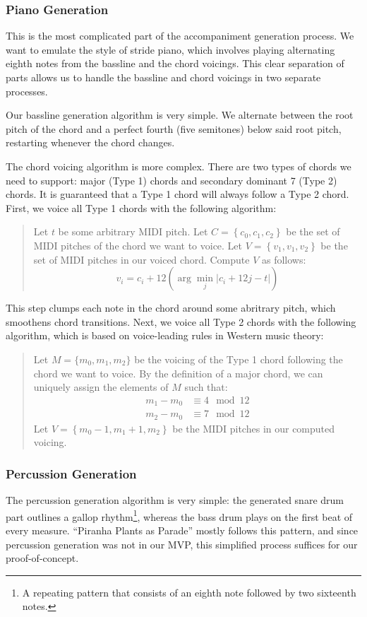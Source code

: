 \subsubsection{Piano Generation}

This is the most complicated part of the accompaniment generation process. We want to emulate the style of stride piano, which involves playing alternating eighth notes from the bassline and the chord voicings. This clear separation of parts allows us to handle the bassline and chord voicings in two separate processes.

Our bassline generation algorithm is very simple. We alternate between the root pitch of the chord and a perfect fourth (five semitones) below said root pitch, restarting whenever the chord changes.

The chord voicing algorithm is more complex. There are two types of chords we need to support: major (Type 1) chords and secondary dominant 7 (Type 2) chords. It is guaranteed that a Type 1 chord will always follow a Type 2 chord. First, we voice all Type 1 chords with the following algorithm:
\begin{quote}
    Let $t$ be some arbitrary MIDI pitch.
    Let $C = \left\{ c_0, c_1, c_2 \right\}$ be the set of MIDI pitches of the chord we want to voice.
    Let $V = \left\{ v_1, v_1, v_2 \right\}$ be the set of MIDI pitches in our voiced chord.
    Compute $V$ as follows:
    $$v_i = c_i + 12 \left( \arg\min_{j} \left\vert c_i + 12j - t \right\vert \right)$$
\end{quote}
This step clumps each note in the chord around some abritrary pitch, which smoothens chord transitions. Next, we voice all Type 2 chords with the following algorithm, which is based on voice-leading rules in Western music theory:
\begin{quote}
    Let $M = \{ m_0, m_1, m_2\}$ be the voicing of the Type 1 chord following the chord we want to voice. By the definition of a major chord, we can uniquely assign the elements of $M$ such that:
    \begin{align*}
        m_1 - m_0 &\equiv 4 \mod 12 \\
        m_2 - m_0 &\equiv 7 \mod 12
    \end{align*}
    Let $V = \left\{ m_0 - 1, m_1 + 1, m_2 \right\}$ be the MIDI pitches in our computed voicing.
\end{quote}

\subsubsection{Percussion Generation}

The percussion generation algorithm is very simple: the generated snare drum part outlines a gallop rhythm\footnote{A repeating pattern that consists of an eighth note followed by two sixteenth notes.}, whereas the bass drum plays on the first beat of every measure. ``Piranha Plants as Parade'' mostly follows this pattern, and since percussion generation was not in our MVP, this simplified process suffices for our proof-of-concept.